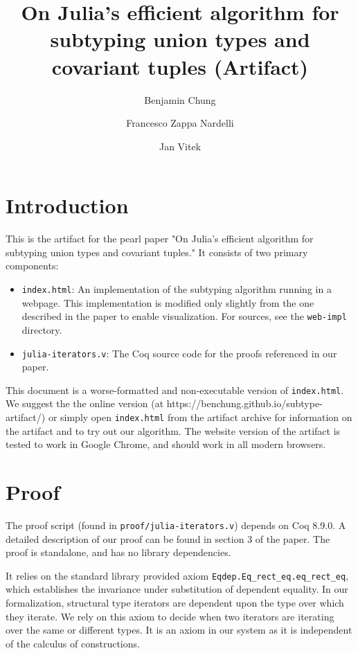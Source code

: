 \documentclass{darts-v2019}
\title{On Julia’s efficient algorithm for subtyping union types and covariant tuples (Artifact)}
\author{Benjamin Chung}{Northeastern University}{bchung@ccs.neu.edu}{}{}
\author{Francesco Zappa Nardelli}{Inria}{francesco.zappa\_nardelli@inria.fr}{}{}
\author{Jan Vitek}{Northeastern University \and Czech Technical University in Prague}{j.vitek@neu.edu}{}{}
\begin{document}
\maketitle

\section{Introduction}

This is the artifact for the pearl paper "On Julia’s efficient algorithm for subtyping union types and covariant tuples." It consists of two primary components:

\begin{itemize}
\item \texttt{index.html}: An implementation of the subtyping algorithm running in a webpage. This implementation is modified only slightly from the one described in the paper to enable visualization. For sources, see the \texttt{web-impl} directory.
\item \texttt{julia-iterators.v}: The Coq source code for the proofs referenced in our paper.
\end{itemize}

This document is a worse-formatted and non-executable version of
\texttt{index.html}. We suggest the the online version (at
https://benchung.github.io/subtype-artifact/) or simply open
\texttt{index.html} from the artifact archive for information on the artifact
and to try out our algorithm. The website version of the artifact is tested to
work in Google Chrome, and should work in all modern browsers.

\section{Proof}

The proof script (found in \texttt{proof/julia-iterators.v}) depends on Coq 8.9.0. A detailed description of our 
proof can be found in section 3 of the paper. 
The proof is standalone, and has no library dependencies. 

It relies on the standard library provided axiom \verb|Eqdep.Eq_rect_eq.eq_rect_eq|, which establishes the invariance
under substitution of dependent equality. In our formalization, structural type
iterators are dependent upon the type over which they iterate. We rely on this
axiom to decide when two iterators are iterating over the same or different types.
It is an axiom in our system as it is independent of the calculus of constructions.
\end{document}
